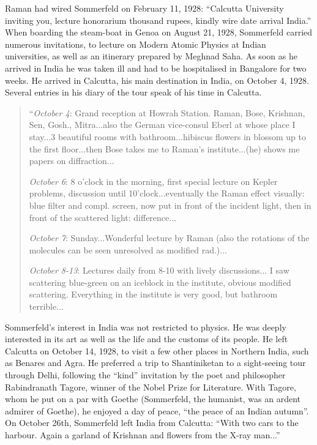 Raman had wired Sommerfeld on February 11, 1928:
``Calcutta University inviting you, lecture honorarium thousand
rupees, kindly wire date arrival India.'' When boarding the 
steam-boat in Genoa on August 21, 1928, Sommerfeld carried numerous
invitations, to lecture on Modern Atomic Physics at Indian
universities, as well as an itinerary prepared by Meghnad Saha.
As soon as he arrived in India he was taken ill and had to be
hospitalised in Bangalore for two weeks. He arrived in Calcutta,
his main destination in India, on October 4, 1928. Several entries
in his diary of the tour speak of his time in Calcutta.
\begin{quote}
{\fontsize{10pt}{12pt}\selectfont
``{\em October 4}: Grand reception at Howrah Station. Raman,
Bose, Krishnan, Sen, Gosh., Mitra...also the German vice-consul
Eberl at whose place I stay...3 beautiful rooms with
bathroom...hibiscus flowers in blossom up to the first floor...then
Bose takes me to Raman's institute...(he) shows me papers on
diffraction...

{\em October 6}: 8 o'clock in the morning, first special lecture on
Kepler problems, discussion until 10'clock...eventually the Raman
effect visually: blue filter and compl. screen, now put in front
of the incident light, then in front of the scattered light:
difference...

{\em October 7}: Sunday...Wonderful lecture by Raman (also the
rotations of the molecules can be seen unresolved as modified
rad.)...

{\em October 8-13}: Lectures daily from 8-10 with lively
discussions... I saw scattering blue-green on an iceblock in the
institute, obvious modified scattering. Everything in the institute
is very good, but bathroom terrible...
}\relax
\end{quote}

Sommerfeld's interest in India was not restricted to physics.
He was deeply interested in its art as well as the life and the
customs of its people. He left Calcutta on October 14, 1928, to
visit a few other places in Northern India, such as Benares and
Agra. He preferred a trip to Shantiniketan to a sight-seeing tour
through Delhi, following the ``kind'' invitation by the poet and
philosopher Rabindranath Tagore, winner of the Nobel Prize for
Literature. With Tagore, whom he put on a par with Goethe
(Sommerfeld, the humanist, was an ardent admirer of Goethe),
he enjoyed a day of peace, ``the peace of an Indian autumn''.
On October 26th, Sommerfeld left India from Calcutta: ``With
two cars to the harbour. Again a garland of Krishnan and flowers
from the X-ray man...''

